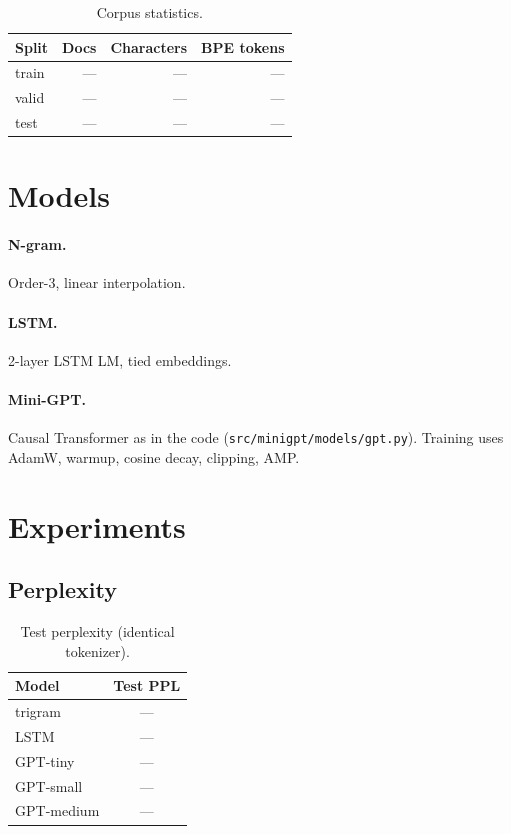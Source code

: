 \documentclass[11pt]{article}
\begin{document}
\begin{table}[t]
\centering
\small
\begin{tabular}{lrrr}
\toprule
Split & Docs & Characters & BPE tokens \\
\midrule
train & --- & --- & --- \\
valid & --- & --- & --- \\
test  & --- & --- & --- \\
\bottomrule
\end{tabular}
\caption{Corpus statistics.}
\end{table}

\section{Models}

\paragraph{N-gram.} Order-3, linear interpolation.

\paragraph{LSTM.} 2-layer LSTM LM, tied embeddings.

\paragraph{Mini-GPT.} Causal Transformer as in the code (\texttt{src/minigpt/models/gpt.py}). Training uses AdamW, warmup, cosine decay, clipping, AMP.

\section{Experiments}

\subsection{Perplexity}

\begin{table}[t]
\centering
\small
\begin{tabular}{lc}
\toprule
Model & Test PPL \\
\midrule
trigram & --- \\
LSTM & --- \\
GPT-tiny & --- \\
GPT-small & --- \\
GPT-medium & --- \\
\bottomrule
\end{tabular}
\caption{Test perplexity (identical tokenizer).}
\end{table}
\end{document}
